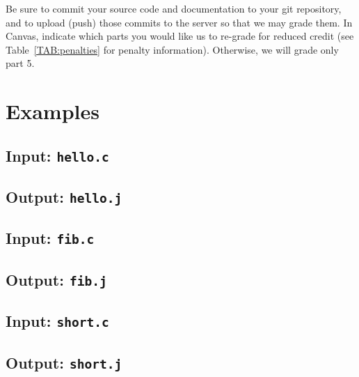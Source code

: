 \documentclass{article}
\newcommand{\flowgen}{5}
\begin{document}
Be sure to commit your source code and documentation to your
git repository, and to upload (push) those commits to the server
so that we may grade them.
In Canvas,
indicate which parts you would like us to re-grade for reduced credit
(see Table~\ref{TAB:penalties} for penalty information).
Otherwise, we will grade only part \flowgen{}.

\section{Examples} \label{SEC:examples}

\subsection{Input: {\tt hello.c}}



\subsection{Output: {\tt hello.j}}



\subsection{Input: {\tt fib.c}}



\subsection{Output: {\tt fib.j}}



\subsection{Input: {\tt short.c}}



\subsection{Output: {\tt short.j}}


\end{document}
